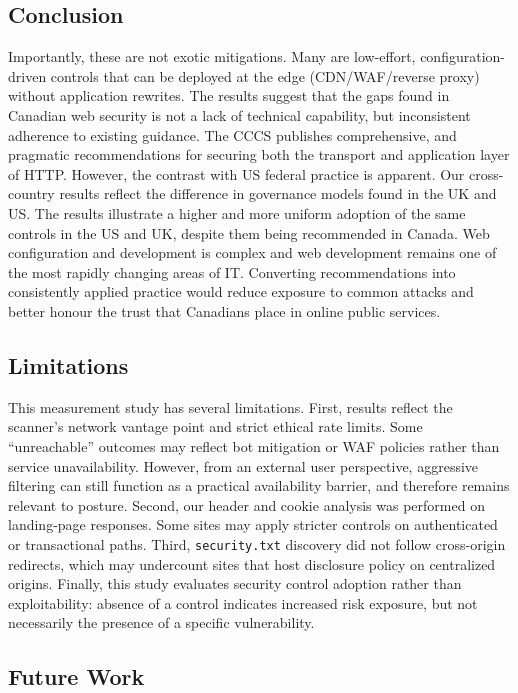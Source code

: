 \documentclass[conference]{IEEEtran}
\begin{document}
\subsection{Conclusion}

Importantly, these are not exotic mitigations. Many are low-effort, configuration-driven controls 
that can be deployed at the edge (CDN/WAF/reverse proxy) without application rewrites. The results suggest that the gaps found in 
Canadian web security is not a lack of
technical capability, but inconsistent adherence to existing guidance. The CCCS publishes comprehensive, 
and pragmatic recommendations for securing both the transport and application layer of HTTP. However, the
contrast with US federal practice is apparent. Our cross-country results 
reflect the difference in governance models found in the UK and US. The results illustrate a higher and more uniform 
adoption of the same controls in the US and UK, despite them being recommended in Canada. Web configuration and development 
is complex and web development remains one of the most rapidly changing areas of IT. Converting recommendations 
into consistently applied practice would reduce exposure to common attacks and better
honour the trust that Canadians place in online public services.


\subsection{Limitations}

This measurement study has several limitations. First, results reflect the scanner’s network vantage point and
strict ethical rate limits. Some ``unreachable'' outcomes may reflect bot mitigation or WAF policies rather than
service unavailability. However, from an external user perspective, aggressive filtering can still function as a
practical availability barrier, and therefore remains relevant to posture. Second, our header and cookie analysis
was performed on landing-page responses. Some sites may apply stricter controls on authenticated or transactional
paths. Third, \texttt{security.txt} discovery did not follow cross-origin redirects, which may undercount sites
that host disclosure policy on centralized origins. Finally, this study evaluates security control adoption rather
than exploitability: absence of a control indicates increased risk exposure, but not necessarily the presence of a
specific vulnerability.

\subsection{Future Work}
\end{document}
